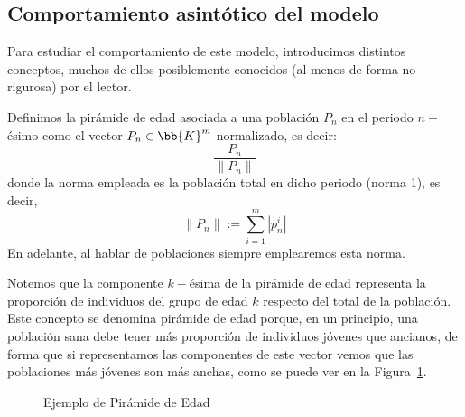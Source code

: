 \subsection{Comportamiento asintótico del modelo}
Para estudiar el comportamiento de este modelo, introducimos distintos conceptos, muchos de ellos posiblemente conocidos (al menos de forma no rigurosa) por el lector.
\begin{definicion}
    Definimos la pirámide de edad asociada a una población $P_n$ en el periodo $n-$ésimo como el vector $P_n\in \bb{K}^m$ normalizado, es decir:
    \begin{equation*}
        \frac{P_n}{\|P_n\|}
    \end{equation*}
    donde la norma empleada es la población total en dicho periodo (norma 1), es decir,
    \begin{equation*}
        \|P_n\| := \sum_{i=1}^m |p_n^i|
    \end{equation*}
    En adelante, al hablar de poblaciones siempre emplearemos esta norma.
\end{definicion}
Notemos que la componente $k-$ésima de la pirámide de edad representa la proporción de individuos del grupo de edad $k$ respecto del total de la población. Este concepto se denomina pirámide de edad porque, en un principio, una población sana debe tener más proporción de individuos jóvenes que ancianos, de forma que si representamos las componentes de este vector vemos que las poblaciones más jóvenes son más anchas, como se puede ver en la Figura~\ref{fig:Pir_Edad}.
\begin{figure}
    \centering
    \caption{Ejemplo de Pirámide de Edad}
    \label{fig:Pir_Edad}
\end{figure}

